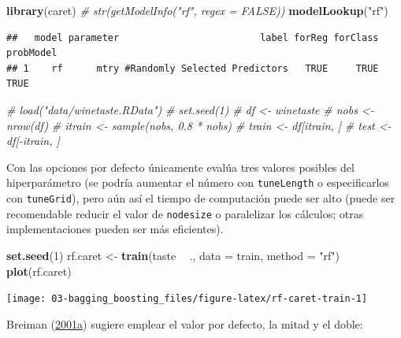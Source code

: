 \documentclass[
  spanish,
]{book}
\newenvironment{Shaded}{\begin{snugshade}}{\end{snugshade}}
\newcommand{\CommentTok}[1]{\textcolor[rgb]{0.56,0.35,0.01}{\textit{#1}}}
\newcommand{\DataTypeTok}[1]{\textcolor[rgb]{0.13,0.29,0.53}{#1}}
\newcommand{\DecValTok}[1]{\textcolor[rgb]{0.00,0.00,0.81}{#1}}
\newcommand{\KeywordTok}[1]{\textcolor[rgb]{0.13,0.29,0.53}{\textbf{#1}}}
\newcommand{\NormalTok}[1]{#1}
\newcommand{\OperatorTok}[1]{\textcolor[rgb]{0.81,0.36,0.00}{\textbf{#1}}}
\newcommand{\StringTok}[1]{\textcolor[rgb]{0.31,0.60,0.02}{#1}}
\theoremstyle{break}
\theoremstyle{definition}
\theoremstyle{definition}
\theoremstyle{definition}
\theoremstyle{remark}
\begin{document}
\begin{Shaded}
\begin{Highlighting}[]
\KeywordTok{library}\NormalTok{(caret)}
\CommentTok{# str(getModelInfo("rf", regex = FALSE))}
\KeywordTok{modelLookup}\NormalTok{(}\StringTok{"rf"}\NormalTok{)}
\end{Highlighting}
\end{Shaded}

\begin{verbatim}
##   model parameter                         label forReg forClass probModel
## 1    rf      mtry #Randomly Selected Predictors   TRUE     TRUE      TRUE
\end{verbatim}

\begin{Shaded}
\begin{Highlighting}[]
\CommentTok{# load("data/winetaste.RData")}
\CommentTok{# set.seed(1)}
\CommentTok{# df <- winetaste}
\CommentTok{# nobs <- nrow(df)}
\CommentTok{# itrain <- sample(nobs, 0.8 * nobs)}
\CommentTok{# train <- df[itrain, ]}
\CommentTok{# test <- df[-itrain, ]}
\end{Highlighting}
\end{Shaded}

Con las opciones por defecto únicamente evalúa tres valores posibles del hiperparámetro (se podría aumentar el número con \texttt{tuneLength} o especificarlos con \texttt{tuneGrid}), pero aún así el tiempo de computación puede ser alto (puede ser recomendable reducir el valor de \texttt{nodesize} o paralelizar los cálculos; otras implementaciones pueden ser más eficientes).

\begin{Shaded}
\begin{Highlighting}[]
\KeywordTok{set.seed}\NormalTok{(}\DecValTok{1}\NormalTok{)}
\NormalTok{rf.caret <-}\StringTok{ }\KeywordTok{train}\NormalTok{(taste }\OperatorTok{~}\StringTok{ }\NormalTok{., }\DataTypeTok{data =}\NormalTok{ train, }\DataTypeTok{method =} \StringTok{"rf"}\NormalTok{)}
\KeywordTok{plot}\NormalTok{(rf.caret)}
\end{Highlighting}
\end{Shaded}

\begin{center}\texttt{[image: 03-bagging\_boosting\_files/figure-latex/rf-caret-train-1]} \end{center}

Breiman (\protect\hyperlink{ref-breiman2001random}{2001}\protect\hyperlink{ref-breiman2001random}{a}) sugiere emplear el valor por defecto, la mitad y el doble:
\end{document}
